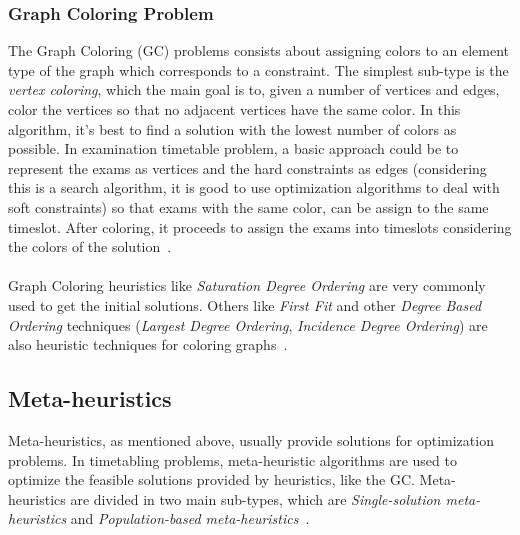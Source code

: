 \subsubsection{Graph Coloring Problem}
The Graph Coloring (GC) problems consists about assigning colors to an element type of the graph which corresponds to a constraint. The simplest sub-type is the \textit{vertex coloring}, which the main goal is to, given a number of vertices and edges, color the vertices so that no adjacent vertices have the same color. In this algorithm, it's best to find a solution with the lowest number of colors as possible. In examination timetable problem, a basic approach could be to represent the exams as vertices and the hard constraints as edges (considering this is a search algorithm, it is good to use optimization algorithms to deal with soft constraints) so that exams with the same color, can be assign to the same timeslot. After coloring, it proceeds to assign the exams into timeslots considering the colors of the solution~\cite{Qu2009}.\\
\\
Graph Coloring heuristics like \textit{Saturation Degree Ordering} are very commonly used to get the initial solutions. Others like \textit{First Fit} and other \textit{Degree Based Ordering} techniques (\textit{Largest Degree Ordering}, \textit{Incidence Degree Ordering}) are also heuristic techniques for coloring graphs~\cite{Carter1996}.\\


\subsection{Meta-heuristics}
Meta-heuristics, as mentioned above, usually provide solutions for optimization problems. In timetabling problems, meta-heuristic algorithms are used to optimize the feasible solutions provided by heuristics, like the GC. Meta-heuristics are divided in two main sub-types, which are \textit{Single-solution meta-heuristics} and \textit{Population-based meta-heuristics}~\cite{Talbi2009}.\\

